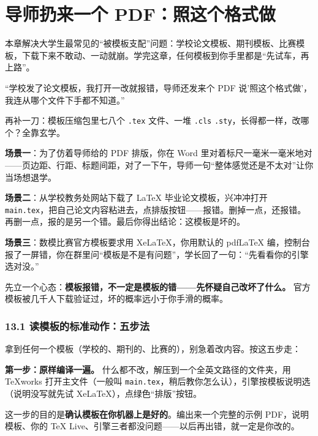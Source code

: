\chapter{导师扔来一个 PDF：照这个格式做}

\begin{notebox}
本章解决大学生最常见的“被模板支配”问题：学校论文模板、期刊模板、比赛模板，下载下来不敢动、一动就崩。学完这章，任何模板到你手里都是“先试车，再上路”。
\end{notebox}


“学校发了论文模板，我打开一改就报错，导师还发来个 PDF 说'照这个格式做'，我连从哪个文件下手都不知道。”

再补一刀：模板压缩包里七八个 \texttt{.tex} 文件、一堆 \texttt{.cls} \texttt{.sty}，长得都一样，改哪个？全靠玄学。


\textbf{场景一}：为了仿着导师给的 PDF 排版，你在 Word 里对着标尺一毫米一毫米地对——页边距、行距、标题间距，对了一下午，导师一句“整体感觉还是不太对”让你当场想退学。

\textbf{场景二}：从学校教务处网站下载了 LaTeX 毕业论文模板，兴冲冲打开 \texttt{main.tex}，把自己论文内容粘进去，点排版按钮——报错。删掉一点，还报错。再删一点，报的是另一个错。最后你得出结论：这模板是坏的。

\textbf{场景三}：数模比赛官方模板要求用 XeLaTeX，你用默认的 pdfLaTeX 编，控制台报了一屏错，你在群里问“模板是不是有问题”，学长回了一句：“先看看你的引擎选对没。”

先立一个心态：\textbf{模板报错，不一定是模板的错——先怀疑自己改坏了什么。} 官方模板被几千人下载验证过，坏的概率远小于你手滑的概率。


\subsection*{13.1 读模板的标准动作：五步法}

拿到任何一个模板（学校的、期刊的、比赛的），别急着改内容。按这五步走：

\textbf{第一步：原样编译一遍。} 什么都不改，解压到一个全英文路径的文件夹，用 TeXworks 打开主文件（一般叫 \texttt{main.tex}，稍后教你怎么认），引擎按模板说明选（说明没写就先试 XeLaTeX），点绿色“排版”按钮。

这一步的目的是\textbf{确认模板在你机器上是好的}。编出来一个完整的示例 PDF，说明模板、你的 TeX Live、引擎三者都没问题——以后再出错，就一定是你改的。

